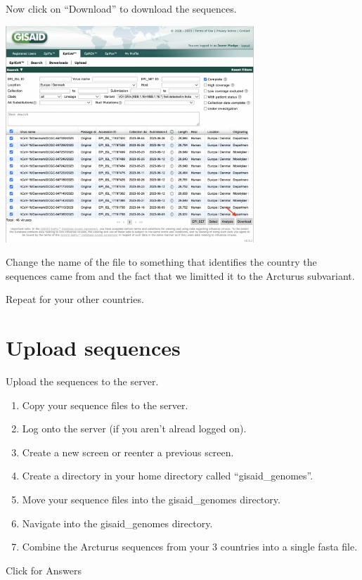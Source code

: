 \documentclass[
]{book}
\providecommand{\tightlist}{%
  \setlength{\itemsep}{0pt}\setlength{\parskip}{0pt}}
\begin{document}
Now click on ``Download'' to download the sequences.

\includegraphics[width=0.7\textwidth,height=\textheight]{./Figures/download.png}

Change the name of the file to something that identifies the country the sequences came from and the fact that we limitted it to the Arcturus subvariant.

Repeat for your other countries.

\hypertarget{upload-sequences}{%
\section{Upload sequences}\label{upload-sequences}}

Upload the sequences to the server.

\begin{enumerate}
\def\labelenumi{\arabic{enumi}.}
\tightlist
\item
  Copy your sequence files to the server.
\item
  Log onto the server (if you aren't alread logged on).
\item
  Create a new screen or reenter a previous screen.
\item
  Create a directory in your home directory called ``gisaid\_genomes''.
\item
  Move your sequence files into the gisaid\_genomes directory.
\item
  Navigate into the gisaid\_genomes directory.
\item
  Combine the Arcturus sequences from your 3 countries into a single fasta file.
\end{enumerate}

Click for Answers
\end{document}
